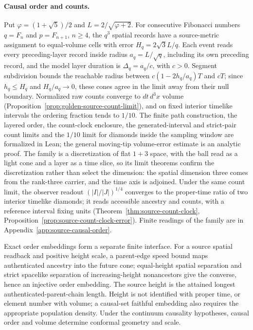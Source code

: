 \documentclass[11pt]{article}
\begin{document}
\paragraph{Causal order and counts.}
Put $\varphi=(1+\sqrt5)/2$ and $L=2/\sqrt{\varphi+2}$. For consecutive
Fibonacci numbers $q=F_n$ and $p=F_{n+1}$, $n\geq4$, the $q^3$ spatial records
have a source-metric assignment to equal-volume cells with error
$H_q=2\sqrt3L/q$. Each event reads every preceding-layer record inside radius
$a_q=L/\sqrt q$, including its own preceding record, and the model layer
duration is $\Delta_q=a_q/c$, with $c>0$. Segment subdivision bounds the
reachable radius between $c(1-2h_q/a_q)T$ and $cT$; since $h_q\leq H_q$ and
$H_q/a_q\to0$, these cones agree in the limit away from their null boundary.
Normalized raw counts converge to $dt\,d^3x$ volume
(Proposition~\ref{prop:golden-source-count-limit}), and on fixed interior
timelike intervals the ordering fraction tends to $1/10$. The finite path
construction, the layered order, the count-clock enclosure, the
generated-interval and strict-pair count limits and the $1/10$ limit for
diamonds inside the sampling window are formalized in Lean; the general
moving-tip volume-error estimate is an analytic proof. The family is a
discretization of flat $1+3$ space, with the ball read as a light cone and a
layer as a time slice, so its limit theorems confirm the discretization rather
than select the dimension: the spatial dimension three comes from the
rank-three carrier, and the time axis is adjoined. Under the same count limit,
the observer readout $(|I|/|J|)^{1/4}$ converges to the proper-time ratio of
two interior timelike diamonds; it reads accessible ancestry and counts, with
a reference interval fixing units
(Theorem~\ref{thm:source-count-clock},
Proposition~\ref{prop:source-count-clock-error}). Finite readings of the
family are in Appendix~\ref{app:source-causal-order}.

Exact order embeddings form a separate finite interface. For a source spatial
readback and positive height scale, a parent-edge speed bound maps
authenticated ancestry into the future cone; equal-height spatial separation
and strict spacelike separation of increasing-height nonancestors give the
converse, hence an injective order embedding. The source height is the
attained longest authenticated-parent-chain length. Height is not identified
with proper time, or element number with volume; a causal-set faithful
embedding also requires the appropriate population
density\cite{bombelli1987,surya2019}. Under the continuum causality
hypotheses, causal order and volume determine conformal geometry and
scale\cite{hawkingkingmccarthy1976,malament1977}.
\end{document}
